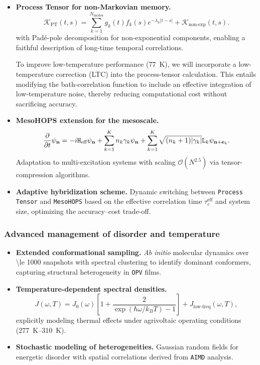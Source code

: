 \documentclass[12pt, a4paper]{article}
\begin{document}
\begin{itemize}
    \item \textbf{Process Tensor for non-Markovian memory.} 
    \begin{equation}
    \mathcal{K}_{\text{PT}}(t,s) = \sum_{k=1}^{N_{\text{modes}}} g_k(t) f_k(s) e^{-\lambda_k |t-s|} + \mathcal{K}_{\text{non-exp}}(t,s).
    \end{equation}
    with Padé-pole decomposition for non-exponential components, enabling a faithful description of long-time temporal correlations.

    To improve low-temperature performance (\SI{77}{\kelvin}), we will incorporate a low-temperature correction (LTC) into the process-tensor calculation. This entails modifying the bath-correlation function to include an effective integration of low-temperature noise, thereby reducing computational cost without sacrificing accuracy.
    
    \item \textbf{MesoHOPS extension for the mesoscale.}
    \begin{equation}
    \pdv{t} \psi_{\mathbf{n}} = -i\mathtt{H}_{\text{eff}}\psi_{\mathbf{n}} + \sum_{k=1}^K n_k\gamma_k\psi_{\mathbf{n}} + \sum_{k=1}^K \sqrt{(n_k+1)|\gamma_k|} \mathtt{L}_k\psi_{\mathbf{n}+\mathbf{e}_k}.
    \end{equation}
    Adaptation to multi-excitation systems with scaling $\mathcal{O}(N^{2.5})$ via tensor-compression algorithms.
    
    \item \textbf{Adaptive hybridization scheme.} Dynamic switching between \texttt{Process Tensor} and \texttt{MesoHOPS} based on the effective correlation time $\tau_c^{\text{eff}}$ and system size, optimizing the accuracy–cost trade-off.
\end{itemize}

\subsubsection{Advanced management of disorder and temperature}

\begin{itemize}
    \item \textbf{Extended conformational sampling.} \textit{Ab initio} molecular dynamics over \num{\le 1000} snapshots with spectral clustering to identify dominant conformers, capturing structural heterogeneity in \texttt{OPV} films.
    
    \item \textbf{Temperature-dependent spectral densities.}
    \begin{equation}
    J(\omega, T) = J_0(\omega)\left[1 + \frac{2}{\exp(\hbar\omega/k_B T) - 1}\right] + J_{\text{low-freq}}(\omega, T),
    \end{equation}
    explicitly modeling thermal effects under agrivoltaic operating conditions (\SIrange{277}{310}{\kelvin}).
    
    \item \textbf{Stochastic modeling of heterogeneities.} Gaussian random fields for energetic disorder with spatial correlations derived from \texttt{AIMD} analysis.
\end{itemize}
\end{document}
